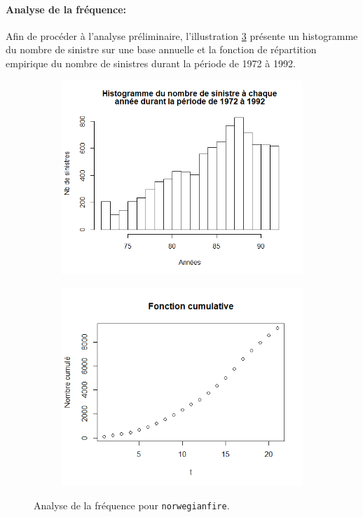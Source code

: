 		\paragraph{Analyse de la fréquence:}
			Afin de procéder à l'analyse préliminaire, l'illustration \ref{Graph_Freq_NorvFire} présente un histogramme du nombre de sinistre sur une base annuelle et la fonction de répartition empirique du nombre de sinistres durant la période de 1972 à 1992.
			
			\begin{figure}[H]
			\centering
				\begin{subfigure}[b]{0.45\textwidth}
					\includegraphics[scale=0.45]{Graphiques/HistFreqNorwegianfire} 
					\caption{} \label{HistFreqNorwegianfire}
				\end{subfigure}
				\begin{subfigure}[b]{0.4\textwidth}
					\includegraphics[scale=0.45]{Graphiques/Graph_Norwegianfire_FreqCumul} 
					\caption{} \label{Graph_Norwegianfire_FreqCumul}
				\end{subfigure}
				\renewcommand{\figurename}{Illustration}
				\caption{Analyse de la fréquence pour \texttt{norwegianfire}.}\label{Graph_Freq_NorvFire}
			\end{figure}
		
